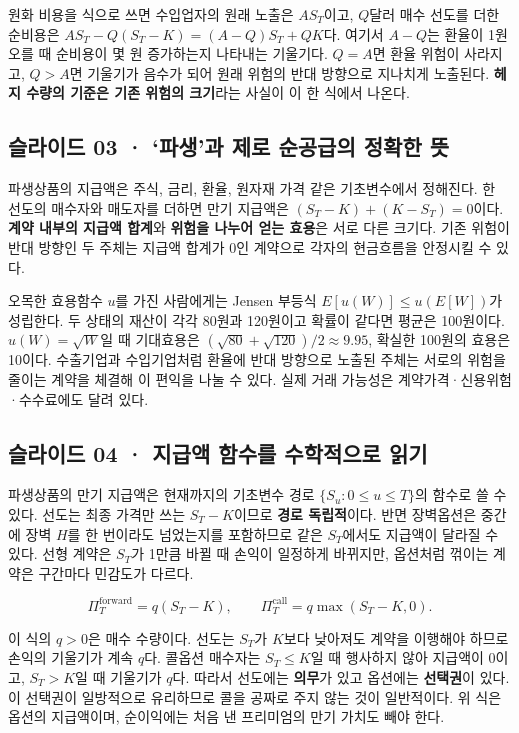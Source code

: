 \documentclass[11pt,a4paper]{article}
\begin{document}
원화 비용을 식으로 쓰면 수입업자의 원래 노출은 $A S_T$이고, $Q$달러 매수 선도를 더한 순비용은 $A S_T-Q(S_T-K)=(A-Q)S_T+QK$다. 여기서 $A-Q$는 환율이 1원 오를 때 순비용이 몇 원 증가하는지 나타내는 기울기다. $Q=A$면 환율 위험이 사라지고, $Q>A$면 기울기가 음수가 되어 원래 위험의 반대 방향으로 지나치게 노출된다. \textbf{헤지 수량의 기준은 기존 위험의 크기}라는 사실이 이 한 식에서 나온다.\par

\subsection{슬라이드 03 · ‘파생’과 제로 순공급의 정확한 뜻}
파생상품의 지급액은 주식, 금리, 환율, 원자재 가격 같은 기초변수에서 정해진다. 한 선도의 매수자와 매도자를 더하면 만기 지급액은 $(S_T-K)+(K-S_T)=0$이다. \textbf{계약 내부의 지급액 합계}와 \textbf{위험을 나누어 얻는 효용}은 서로 다른 크기다. 기존 위험이 반대 방향인 두 주체는 지급액 합계가 0인 계약으로 각자의 현금흐름을 안정시킬 수 있다.\par

오목한 효용함수 $u$를 가진 사람에게는 Jensen 부등식 $E[u(W)]\le u(E[W])$가 성립한다. 두 상태의 재산이 각각 80원과 120원이고 확률이 같다면 평균은 100원이다. $u(W)=\sqrt W$일 때 기대효용은 $(\sqrt{80}+\sqrt{120})/2\approx9.95$, 확실한 100원의 효용은 10이다. 수출기업과 수입기업처럼 환율에 반대 방향으로 노출된 주체는 서로의 위험을 줄이는 계약을 체결해 이 편익을 나눌 수 있다. 실제 거래 가능성은 계약가격·신용위험·수수료에도 달려 있다.\par

\subsection{슬라이드 04 · 지급액 함수를 수학적으로 읽기}
파생상품의 만기 지급액은 현재까지의 기초변수 경로 $\{S_u:0\leq u\leq T\}$의 함수로 쓸 수 있다. 선도는 최종 가격만 쓰는 $S_T-K$이므로 \textbf{경로 독립적}이다. 반면 장벽옵션은 중간에 장벽 $H$를 한 번이라도 넘었는지를 포함하므로 같은 $S_T$에서도 지급액이 달라질 수 있다. 선형 계약은 $S_T$가 1만큼 바뀔 때 손익이 일정하게 바뀌지만, 옵션처럼 꺾이는 계약은 구간마다 민감도가 다르다.\par

\[
\Pi_T^{\mathrm{forward}}=q(S_T-K),\qquad
\Pi_T^{\mathrm{call}}=q\max(S_T-K,0).
\]

이 식의 $q>0$은 매수 수량이다. 선도는 $S_T$가 $K$보다 낮아져도 계약을 이행해야 하므로 손익의 기울기가 계속 $q$다. 콜옵션 매수자는 $S_T\le K$일 때 행사하지 않아 지급액이 0이고, $S_T>K$일 때 기울기가 $q$다. 따라서 선도에는 \textbf{의무}가 있고 옵션에는 \textbf{선택권}이 있다. 이 선택권이 일방적으로 유리하므로 콜을 공짜로 주지 않는 것이 일반적이다. 위 식은 옵션의 지급액이며, 순이익에는 처음 낸 프리미엄의 만기 가치도 빼야 한다.\par
\end{document}
